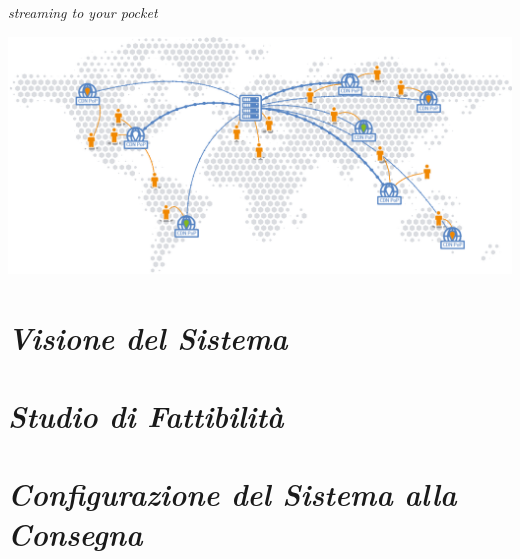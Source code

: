 \documentclass{article}
\author{Agosta, Belli, Emili, Giacchini, Luciani}
\begin{document}
\begin{center}
    \sffamily{\fontsize{50}{48} \selectfont \textcolor{red}{Nexi}\textcolor{green}{Fy}}
\end{center}

\begin{center}
    \itshape{\fontsize{20}{48} \selectfont streaming to your pocket}
\end{center}

\bigskip\bigskip\bigskip

\begin{flushleft}
    \includegraphics[scale=1]{images/worldCDN.png}
\end{flushleft}

\newpage
\printindex

\tableofcontents

\newpage
\section{\itshape{Visione del Sistema}}


\section{\itshape{Studio di Fattibilità}}


\section{\itshape{Configurazione del Sistema alla Consegna}}

\end{document}
